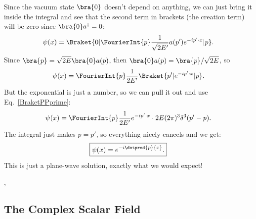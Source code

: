 \begin{itemize}
\begin{equation*}
        \end{equation*}
        Since the vacuum state $\bra{0}$ doesn't depend on anything, we can just bring it inside the integral and see that the second term in brackets (the creation term) will be zero since $\bra{0}a^{\dagger} = 0$:
        \begin{equation*}
            \psi(x) = \Braket{0 | \FourierInt{p} \frac{1}{\sqrt{2E'}} a(p')e^{-ip' \cdot x} | p}.
        \end{equation*}
        Since $\bra{p} = \sqrt{2E} \bra{0} a(p)$, then $\bra{0}a(p) = \bra{p}/\sqrt{2E}$, so
        \begin{equation*}
            \psi(x) = \FourierInt{p} \frac{1}{2E'} \Braket{p' | e^{-i p' \cdot x} | p}.
        \end{equation*}
        But the exponential is just a number, so we can pull it out and use Eq.~\eqref{BraketPPprime}:
        \begin{equation}
            \psi(x) = \FourierInt{p} \frac{1}{2E'} e^{-i p' \cdot x} \cdot 2E(2\pi)^3\delta^3(p'-p).
        \end{equation}
        The integral just makes $p=p'$, so everything nicely cancels and we get:
        \begin{equation*}
            \boxed{\psi(x) = e^{-i \dotprod{p}{x}}.}
        \end{equation*}
        This is just a plane-wave solution, exactly what we would expect!
\end{itemize}

\sep

\subsection*{The Complex Scalar Field}

